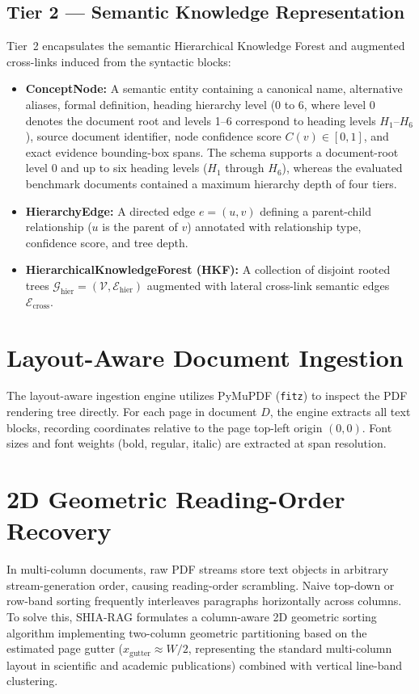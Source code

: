 \documentclass[12pt,a4paper]{report}
\begin{document}
\subsection{Tier 2 --- Semantic Knowledge Representation}
Tier~2 encapsulates the semantic Hierarchical Knowledge Forest and augmented cross-links induced from the syntactic blocks:
\begin{itemize}
    \item \textbf{ConceptNode:} A semantic entity containing a canonical name, alternative aliases, formal definition, heading hierarchy level (0 to 6, where level 0 denotes the document root and levels 1--6 correspond to heading levels $H_1$--$H_6$), source document identifier, node confidence score $C(v) \in [0, 1]$, and exact evidence bounding-box spans. The schema supports a document-root level 0 and up to six heading levels ($H_1$ through $H_6$), whereas the evaluated benchmark documents contained a maximum hierarchy depth of four tiers.
    \item \textbf{HierarchyEdge:} A directed edge $e = (u, v)$ defining a parent-child relationship ($u$ is the parent of $v$) annotated with relationship type, confidence score, and tree depth.
    \item \textbf{HierarchicalKnowledgeForest (HKF):} A collection of disjoint rooted trees $\mathcal{G}_{\text{hier}} = (\mathcal{V}, \mathcal{E}_{\text{hier}})$ augmented with lateral cross-link semantic edges $\mathcal{E}_{\text{cross}}$.
\end{itemize}

\section{Layout-Aware Document Ingestion}
The layout-aware ingestion engine utilizes PyMuPDF (\texttt{fitz}) to inspect the PDF rendering tree directly. For each page in document $D$, the engine extracts all text blocks, recording coordinates relative to the page top-left origin $(0, 0)$. Font sizes and font weights (bold, regular, italic) are extracted at span resolution.

\section{2D Geometric Reading-Order Recovery}
In multi-column documents, raw PDF streams store text objects in arbitrary stream-generation order, causing reading-order scrambling. Naive top-down or row-band sorting frequently interleaves paragraphs horizontally across columns. To solve this, SHIA-RAG formulates a column-aware 2D geometric sorting algorithm implementing two-column geometric partitioning based on the estimated page gutter ($x_{\text{gutter}} \approx W / 2$, representing the standard multi-column layout in scientific and academic publications) combined with vertical line-band clustering.
\end{document}
